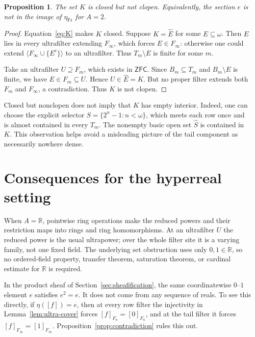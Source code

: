\documentclass[11pt,letterpaper]{article}
\newtheorem{proposition}[theorem]{Proposition}
\theoremstyle{definition}
\theoremstyle{remark}
\newcommand{\om}{\omega}
\newcommand{\Fr}{\mathrm{Fr}}
\newcommand{\gen}[1]{\langle #1\rangle}
\newcommand{\co}{\mathrm c}
\newcommand{\ZFC}{\mathsf{ZFC}}
\begin{document}
\begin{proposition}\label{prop:K}
The set $K$ is closed but not clopen. Equivalently, the section $e$
is not in the image of $\eta_{\Fr}$ for $A=2$.
\end{proposition}
\begin{proof}
Equation~\eqref{eq:K} makes $K$ closed. Suppose $K=\widehat E$ for
some $E\subseteq\om$. Then $E$ lies in every ultrafilter extending
$F_\infty$, which forces $E\in F_\infty$: otherwise one could
extend $\gen{F_\infty\cup\{E^\co\}}$ to an ultrafilter. Thus
$T_m\setminus E$ is finite for some $m$.

Take an ultrafilter $U\supseteq F_m$, which exists in $\ZFC$.
Since $B_m\subseteq T_m$ and $B_m\setminus E$ is finite, we have
$E\in F_m\subseteq U$. Hence $U\in\widehat E=K$. But no
proper filter extends both $F_m$ and $F_\infty$, a contradiction.
Thus $K$ is not clopen.
\end{proof}

Closed but nonclopen does not imply that $K$ has empty interior. Indeed,
one can choose the explicit selector $S=\{2^n-1:n<\om\}$, which
meets each row once and is almost contained in every $T_m$.
The nonempty basic open set $\widehat S$ is contained in $K$.
This observation helps avoid a misleading picture of the tail component
as necessarily nowhere dense.

\section{Consequences for the hyperreal setting}
\label{sec:hyperreals}

When $A=\mathbb R$, pointwise ring operations make the reduced powers
and their restriction maps into rings and ring homomorphisms. At an
ultrafilter $U$ the reduced power is the usual ultrapower; over the
whole filter site it is a varying family, not one fixed field. The
underlying set obstruction uses only $0,1\in\mathbb R$, so no
ordered-field property, transfer theorem, saturation theorem, or
cardinal estimate for $\mathbb R$ is required.

In the product sheaf of Section~\ref{sec:sheafification}, the same
coordinatewise $0$--$1$ element $e$ satisfies $e^2=e$. It does not come
from any sequence of reals. To see this directly, if $\eta([f])=e$,
then at every row filter the injectivity in
Lemma~\ref{lem:ultra-cover} forces $[f]_{F_n}=[0]_{F_n}$, and at
the tail filter it forces $[f]_{F_\infty}=[1]_{F_\infty}$.
Proposition~\ref{prop:contradiction} rules this out.
\end{document}
